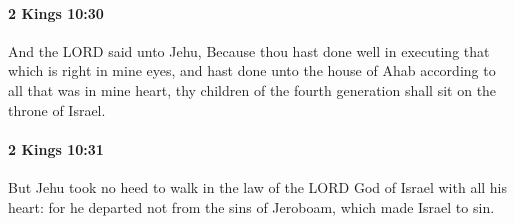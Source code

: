 		\paragraph{2 Kings 10:30} %
			\label{2KINGS-10-30}

			And the LORD said unto Jehu, Because thou hast done well in executing that which is right in mine eyes, and hast done unto the house of Ahab according to all that was in mine heart, thy children of the fourth generation shall sit on the throne of Israel.


		\paragraph{2 Kings 10:31} %
			\label{2KINGS-10-31}

			But Jehu took no heed to walk in the law of the LORD God of Israel with all his heart: for he departed not from the sins of Jeroboam, which made Israel to sin.

